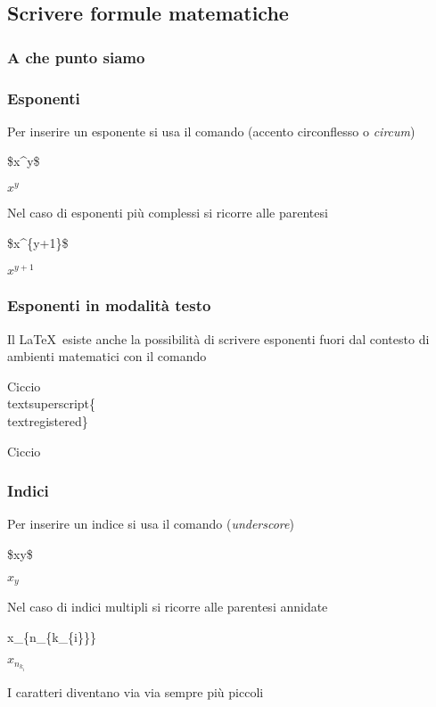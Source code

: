 \documentclass[svgnames,%
	ucs,%
	pdftex]{guitbeamer}
\begin{document}
\subsection{Scrivere formule matematiche}
\begin{frame}
  \frametitle{A che punto siamo}
\end{frame}
\begin{frame}
  \frametitle{Esponenti}
	Per inserire un esponente si usa il comando \LCmd[]{\textasciicircum} (accento circonflesso o \textit{circum})
 	\begin{LaTeXcode}
		\$x\alert{\textasciicircum}y\$
 	\end{LaTeXcode}
	\begin{LaTeXoutput}
		$x^y$
	\end{LaTeXoutput}
	Nel caso di esponenti pi\`u complessi si ricorre alle parentesi
 	\begin{LaTeXcode}
		\$x\textasciicircum \alert{\{y+1\}}\$
 	\end{LaTeXcode}
	\begin{LaTeXoutput}
		$x^{y+1}$
	\end{LaTeXoutput}
\end{frame}
\begin{frame}
  \frametitle{Esponenti in modalit\`a testo}
	Il \LaTeX\ esiste anche la possibilit\`a di scrivere esponenti fuori dal contesto di ambienti matematici con il comando  
 	\begin{LaTeXcode}
		Ciccio\alert{\\textsuperscript\{}\\textregistered\alert{\}}
 	\end{LaTeXcode}
	\begin{LaTeXoutput}
		Ciccio\textsuperscript{\textregistered}
	\end{LaTeXoutput}
\end{frame}
\begin{frame}
  \frametitle{Indici}
	Per inserire un indice si usa il comando \LCmd[]{\textunderscore} (\textit{underscore})
 	\begin{LaTeXcode}
		\$x\alert{\textunderscore}y\$
 	\end{LaTeXcode}
	\begin{LaTeXoutput}
		$x_y$
	\end{LaTeXoutput}
	Nel caso di indici multipli si ricorre alle parentesi annidate
 	\begin{LaTeXcode}
		x\_\{n\_\{\alert{k\_\{i\}}\}\}
 	\end{LaTeXcode}
	\begin{LaTeXoutput}
		$x_{n_{k_{i}}}$
	\end{LaTeXoutput}
	I caratteri diventano via via sempre pi\`u piccoli
\end{frame}
\end{document}

